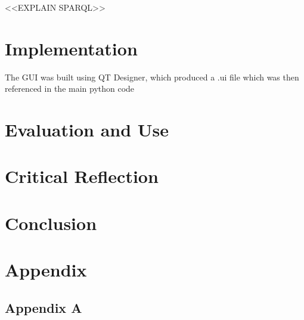 \documentclass[a4paper]{article}
\begin{document}
\fi
<<EXPLAIN SPARQL>>

\section{Implementation}

The GUI was built using QT Designer, which produced a .ui file which was then referenced in the main python code

\section{Evaluation and Use}

\section{Critical Reflection}

\section{Conclusion}

\printbibliography

\section*{Appendix}
\subsection*{Appendix A}
\inputminted{python}{main.py}
\end{document}
